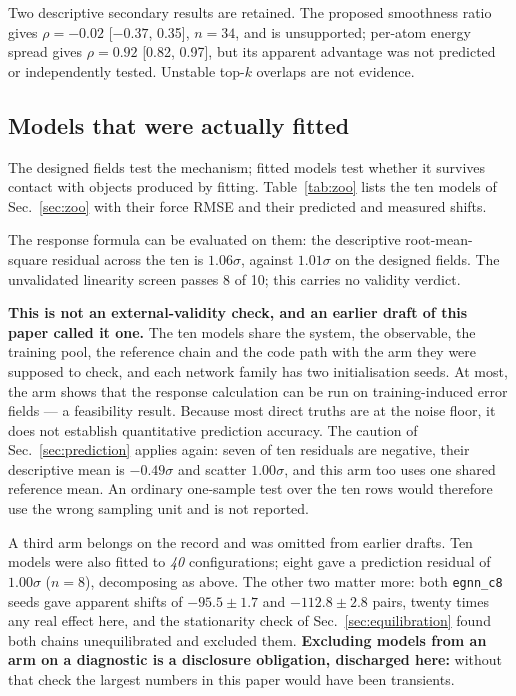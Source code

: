 \documentclass[aip,jcp,reprint,amsmath,amssymb,floatfix]{revtex4-2}
\begin{document}
Two descriptive secondary results are retained. The proposed smoothness ratio
gives $\rho=-0.02$ [$-0.37$, 0.35], $n=34$, and is unsupported; per-atom energy
spread gives $\rho=0.92$ [0.82, 0.97], but its apparent advantage was not
predicted or independently tested. Unstable top-$k$ overlaps are not evidence.

\subsection{Models that were actually fitted}
\label{sec:fitted}

The designed fields test the mechanism; fitted models test whether it
survives contact with objects produced by fitting. Table~\ref{tab:zoo} lists
the ten models of Sec.~\ref{sec:zoo} with their force
RMSE and their predicted and measured shifts.

The response formula can be evaluated on them: the descriptive root-mean-square
residual across the ten is $1.06\sigma$, against $1.01\sigma$ on the designed
fields. The unvalidated linearity screen passes 8 of 10; this carries no
validity verdict.

\textbf{This is not an external-validity check, and an earlier draft of this
paper called it one.} The ten models share the system, the observable, the
training pool, the reference chain and the code path with the arm they were
supposed to check, and each network family has two initialisation seeds. At
most, the arm shows that the response calculation can be run on
training-induced error fields --- a feasibility result. Because most direct
truths are at the noise floor, it does not establish quantitative prediction
accuracy. The caution of
Sec.~\ref{sec:prediction} applies again: seven of ten residuals are negative,
their descriptive mean is $-0.49\sigma$ and scatter $1.00\sigma$, and this arm
too uses one shared reference mean. An ordinary one-sample test over the ten
rows would therefore use the wrong sampling unit and is not reported.

A third arm belongs on the record and was omitted from earlier drafts.
Ten models were also fitted to \emph{40} configurations; eight
gave a prediction residual of $1.00\sigma$ ($n = 8$), decomposing as above.
The other two matter more: both
\texttt{egnn\_c8} seeds gave apparent
shifts of $-95.5 \pm 1.7$ and $-112.8 \pm 2.8$ pairs, twenty times
any real effect here, and the stationarity check of
Sec.~\ref{sec:equilibration} found both chains unequilibrated
and excluded them. \textbf{Excluding models from an arm on a diagnostic is a
disclosure obligation, discharged here:} without that check the largest
numbers in this paper would have been transients.
\end{document}
